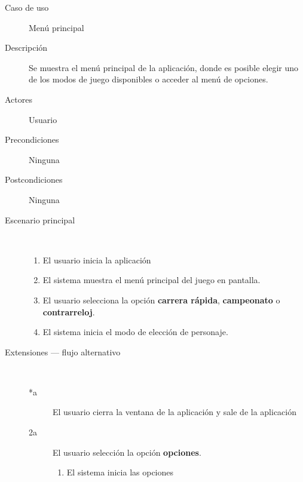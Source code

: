 \begin{description}
    \item[Caso de uso] Menú principal
    \item[Descripción] Se muestra el menú principal de la aplicación, donde es
    posible elegir uno de los modos de juego disponibles
    o acceder al menú de opciones.
    \item[Actores] Usuario
    \item[Precondiciones] Ninguna
    \item[Postcondiciones] Ninguna
    \item[Escenario principal] $\quad$
        \begin{enumerate}
            \item El usuario inicia la aplicación
            \item El sistema muestra el menú principal del juego en pantalla.
            \item El usuario selecciona la opción \textbf{carrera rápida}, \textbf{campeonato} o \textbf{contrarreloj}.
            \item El sistema inicia el modo de elección de personaje.
        \end{enumerate}
    \item[Extensiones --- flujo alternativo] $\quad$
        \begin{description}
            \item[*a ] El usuario cierra la ventana de la aplicación y sale de la aplicación
            
            
            
            \item[2a ] El usuario selección la opción \textbf{opciones}.
            \begin{enumerate}
                \item El sistema inicia las opciones
            \end{enumerate}
            

\end{description}
\end{description}
